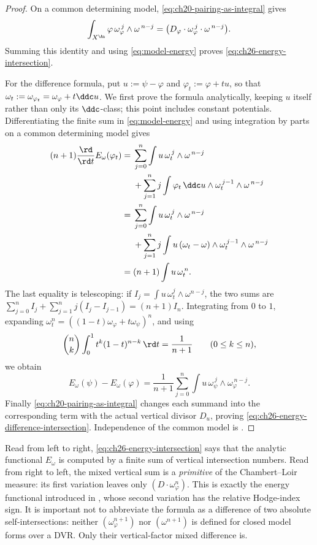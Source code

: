 \begin{proof}
On a common determining model,
\eqref{eq:ch20-pairing-as-integral} gives
\[
 \int_{X^{\An}}\varphi\,
       \omega_\varphi^{\,j}\wedge\omega^{\,n-j}
 =\bigl(D_\varphi\cdot\omega_\varphi^{\,j}
                         \cdot\omega^{\,n-j}\bigr).
\]
Summing this identity and using \eqref{eq:model-energy} proves
\eqref{eq:ch26-energy-intersection}.

For the difference formula, put $u:=\psi-\varphi$ and
$\varphi_t:=\varphi+tu$, so that
$\omega_t:=\omega_{\varphi_t}=\omega_\varphi+t\ddc u$.  We first prove
the formula analytically, keeping $u$ itself rather than only its
$\ddc$-class; this point includes constant potentials.  Differentiating
the finite sum in \eqref{eq:model-energy} and using integration by parts on
a common determining model gives
\[
\begin{aligned}
 (n+1)\frac{\rd}{\rd t}E_\omega(\varphi_t)
 ={}&\sum_{j=0}^n\int u\,\omega_t^{\,j}\wedge\omega^{\,n-j}\\
 &+\sum_{j=1}^n j\int \varphi_t\,\ddc u\wedge
             \omega_t^{\,j-1}\wedge\omega^{\,n-j}\\
 ={}&\sum_{j=0}^n\int u\,\omega_t^{\,j}\wedge\omega^{\,n-j}\\
 &+\sum_{j=1}^n j\int u\,(\omega_t-\omega)\wedge
             \omega_t^{\,j-1}\wedge\omega^{\,n-j}\\
 ={}&(n+1)\int u\,\omega_t^{\,n}.
\end{aligned}
\]
The last equality is telescoping: if
$I_j=\int u\,\omega_t^j\wedge\omega^{n-j}$, the two sums are
$\sum_{j=0}^n I_j+\sum_{j=1}^n j(I_j-I_{j-1})=(n+1)I_n$.
Integrating from $0$ to $1$, expanding
$\omega_t^n=((1-t)\omega_\varphi+t\omega_\psi)^n$, and using
\[
 \binom nk\int_0^1t^k(1-t)^{n-k}\,\rd t=\frac1{n+1}
 \qquad(0\leq k\leq n),
\]
we obtain
\[
 E_\omega(\psi)-E_\omega(\varphi)
 =\frac1{n+1}\sum_{j=0}^n
   \int u\,\omega_\psi^{\,j}\wedge\omega_\varphi^{\,n-j}.
\]
Finally \eqref{eq:ch20-pairing-as-integral} changes each summand into the
corresponding term with the actual vertical divisor $D_u$, proving
\eqref{eq:ch26-energy-difference-intersection}.  Independence of the common
model is .
\end{proof}

\begin{remark}
\label{rem:ch26-energy-intersection-reading}
Read from left to right, \eqref{eq:ch26-energy-intersection} says that the
analytic functional $E_\omega$ is computed by a finite sum of vertical
intersection numbers.  Read from right to left, the mixed vertical sum is a
\emph{primitive} of the Chambert--Loir measure: its first variation leaves
only $(D\cdot\omega_\varphi^n)$.  This is exactly the energy functional
introduced in , whose second variation has the
relative Hodge-index sign.  It is important not to abbreviate the formula as
a difference of two absolute self-intersections: neither
$(\omega_\varphi^{n+1})$ nor $(\omega^{n+1})$ is defined for closed
model forms over a DVR.  Only their vertical-factor mixed difference is.
\end{remark}

